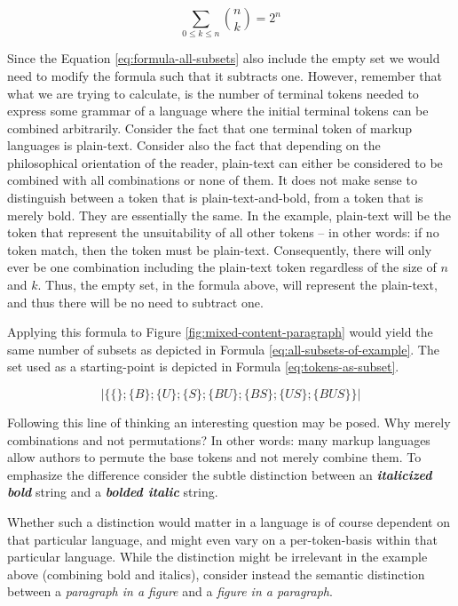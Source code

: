 \documentclass{scrreprt}
\begin{document}
\begin{equation}
\sum_{0\leq{k}\leq{n}} {n \choose k} = 2^n
\label{eq:formula-all-subsets}
\end{equation}

Since the Equation \ref{eq:formula-all-subsets} also include the empty set we would need to modify the formula such that it subtracts one. However, remember that what we are trying to calculate, is the number of terminal tokens needed to express some grammar of a language where the initial terminal tokens can be combined arbitrarily. Consider the fact that one terminal token of markup languages is plain-text. Consider also the fact that depending on the philosophical orientation of the reader, plain-text can either be considered to be combined with all combinations or none of them. It does not make sense to distinguish between a token that is plain-text-and-bold, from a token that is merely bold. They are essentially the same. In the example, plain-text will be the token that represent the unsuitability of all other tokens -- in other words: if no token match, then the token must be plain-text. Consequently, there will only ever be one combination including the plain-text token regardless of the size of \(n\) and \(k\). Thus, the empty set, in the formula above, will represent the plain-text, and thus there will be no need to subtract one.

Applying this formula to Figure \ref{fig:mixed-content-paragraph} would yield the same number of subsets as depicted in Formula \ref{eq:all-subsets-of-example}. The set used as a starting-point is depicted in Formula \ref{eq:tokens-as-subset}.

\begin{equation}
|\{\{\};\{B\};\{U\};\{S\};\{BU\};\{BS\};\{US\};\{BUS\}\}|
\label{eq:all-subsets-of-example}
\end{equation}


Following this line of thinking an interesting question may be posed. Why merely combinations and not permutations? In other words: many markup languages allow authors to permute the base tokens and not merely combine them. To emphasize the difference consider the subtle distinction between an \textit{\textbf{italicized bold}} string and a \textit{\textbf{bolded italic}} string.

Whether such a distinction would matter in a language is of course dependent on that particular language, and might even vary on a per-token-basis within that particular language. While the distinction might be irrelevant in the example above (combining bold and italics), consider instead the semantic distinction between a \emph{paragraph in a figure} and a \emph{figure in a paragraph}.
\end{document}
